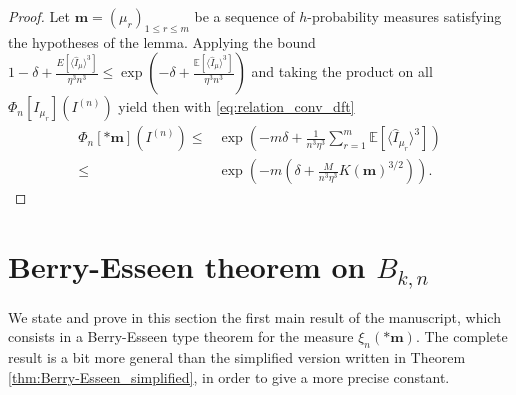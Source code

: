 \documentclass[10pt,11pt]{amsart}%
\begin{document}
\begin{proof}
Let $\mathbf{m}=(\mu_r)_{1\leq r\leq m}$ be a sequence of $h$-probability measures satisfying the hypotheses of the lemma. Applying the bound $1-\delta+\frac{E\left[\langle  \hat{I}_{\mu}\rangle^3\right]}{\eta^3n^3}\leq \exp\left(-\delta+\frac{\mathbb{E}\left[\langle  \hat{I}_{\mu}\rangle^3\right]}{\eta^3n^3}\right)$ and taking the product on all $\Phi_n[I_{\mu_r}](I^{(n)})$ yield then with \eqref{eq:relation_conv_dft}
\begin{align*}
\Phi_{n}[*\mathbf{m}](I^{(n)})\leq& \exp\left(-m\delta+ \frac{1}{n^3\eta^3}\sum_{r=1}^m\mathbb{E}\left[\langle\hat{I}_{\mu_r}\rangle^3\right]\right)\\
\leq &\exp\left(-m\left(\delta+ \frac{M}{n^3\eta^3}K(\mathbf{m})^{3/2}\right)\right).
\end{align*}
\end{proof}


\section{Berry-Esseen theorem on $B_{k,n}$}\label{sec:Berry-Esseen}

We state and prove in this section the first main result of the manuscript, which consists in a Berry-Esseen type theorem for the measure $\xi_n(*\mathbf{m})$. The complete result is a bit more general than the simplified version written in Theorem \ref{thm:Berry-Esseen_simplified}, in order to give a more precise constant.
\end{document}
